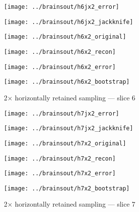 \documentclass[review,supplement,onefignum,onetabnum,juq]{siamonline181217}
\begin{document}
\begin{figure}
\begin{centering}

\parbox{\imsize}{\texttt{[image: ../brainsout/h6jx2\_error]}}
\parbox{\imsize}{\texttt{[image: ../brainsout/h6jx2\_jackknife]}}

\vspace{\vertsep}

\parbox{\imsize}{\texttt{[image: ../brainsout/h6x2\_original]}}
\parbox{\imsize}{\texttt{[image: ../brainsout/h6x2\_recon]}}

\vspace{\vertsep}

\parbox{\imsize}{\texttt{[image: ../brainsout/h6x2\_error]}}
\parbox{\imsize}{\texttt{[image: ../brainsout/h6x2\_bootstrap]}}

\end{centering}
\caption{2$\times$ horizontally retained sampling --- slice 6}
\end{figure}


\begin{figure}
\begin{centering}

\parbox{\imsize}{\texttt{[image: ../brainsout/h7jx2\_error]}}
\parbox{\imsize}{\texttt{[image: ../brainsout/h7jx2\_jackknife]}}

\vspace{\vertsep}

\parbox{\imsize}{\texttt{[image: ../brainsout/h7x2\_original]}}
\parbox{\imsize}{\texttt{[image: ../brainsout/h7x2\_recon]}}

\vspace{\vertsep}

\parbox{\imsize}{\texttt{[image: ../brainsout/h7x2\_error]}}
\parbox{\imsize}{\texttt{[image: ../brainsout/h7x2\_bootstrap]}}

\end{centering}
\caption{2$\times$ horizontally retained sampling --- slice 7}
\end{figure}
\end{document}
